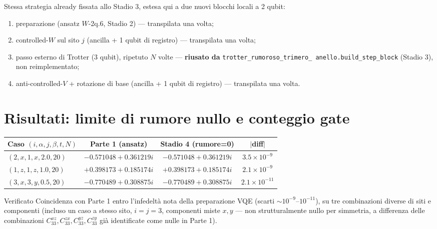 \documentclass[11pt,a4paper]{article}
\begin{document}
Stessa strategia already fissata allo Stadio 3, estesa qui a due nuovi
blocchi locali a 2 qubit:
\begin{enumerate}[leftmargin=1.4em,itemsep=0.2em]
\item preparazione (ansatz $W$-2q.6, Stadio 2) --- transpilata una volta;
\item controlled-$W$ sul sito $j$ (ancilla + 1 qubit di registro) ---
transpilata una volta;
\item passo esterno di Trotter (3 qubit), ripetuto $N$ volte ---
\textbf{riusato da} \texttt{trotter\_\allowbreak rumoroso\_trimero\_
anello.build\_step\_block} (Stadio 3), non reimplementato;
\item anti-controlled-$V$ + rotazione di base (ancilla + 1 qubit di
registro) --- transpilata una volta.
\end{enumerate}

\section{Risultati: limite di rumore nullo e conteggio gate}

\begin{center}
\renewcommand{\arraystretch}{1.25}
\begin{tabular}{@{}lccc@{}}
\toprule
\textbf{Caso $(i,\alpha,j,\beta,t,N)$} & \textbf{Parte 1 (ansatz)} & \textbf{Stadio 4 (rumore=0)} & $|$\textbf{diff}$|$\\
\midrule
$(2,x,1,x,2.0,20)$ & $-0.571048+0.361219i$ & $-0.571048+0.361219i$ & $3.5\times10^{-9}$\\
$(1,z,1,z,1.0,20)$ & $+0.398173+0.185174i$ & $+0.398173+0.185174i$ & $2.1\times10^{-9}$\\
$(3,x,3,y,0.5,20)$ & $-0.770489+0.308875i$ & $-0.770489+0.308875i$ & $2.1\times10^{-11}$\\
\bottomrule
\end{tabular}
\end{center}

\begin{okbox}{Verificato}
Coincidenza con Parte 1 entro l'infedeltà nota della preparazione VQE
(scarti $\sim10^{-9}$--$10^{-11}$), su tre combinazioni diverse di siti e
componenti (incluso un caso a stesso sito, $i=j=3$, componenti miste
$x,y$ --- non strutturalmente nullo per simmetria, a differenza delle
combinazioni $C_{33}^{xz},C_{33}^{zx},C_{33}^{yz},C_{33}^{zy}$ già
identificate come nulle in Parte 1).
\end{okbox}
\end{document}
